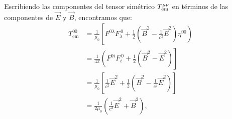 Escribiendo las componentes del tensor simétrico $T_{\rm em}^{\mu\nu}$ en términos
de las componentes de $\vec{E}$ y $\vec{B}$, encontramos que:
\begin{align}
T_\text{em}^{00}  & =\frac{1}{\mu_0}\left[F^{0\lambda}F_\lambda^{\ 0}+\frac
{1}{2}\left(\vec{B}^2-\frac{1}{c^2}\vec{E}^2\right) \eta^{00}\right) \\
& =\frac{1}{4\pi}\left(  F^{0i}F_i^{\ 0}+\frac{1}{2}\left(
\vec{B}^2-\vec{E}^2\right)\right] \\
& =\frac{1}{\mu_0}\left[\frac{1}{c^2}\vec{E}^2+\frac{1}{2}\left( \vec{B}^2-\frac{1}{c^2}\vec{E}^2\right)\right] \\
& =\frac{1}{2\mu_0}\left(\frac{1}{c^2}\vec{E}^2+\vec{B}^2\right),
\end{align}%
